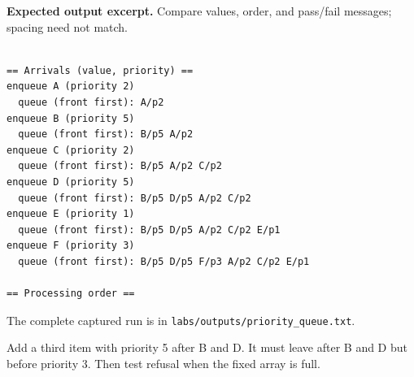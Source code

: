 \textbf{Expected output excerpt.} Compare values, order, and pass/fail messages; spacing need not match.

\begin{lstlisting}[style=utpterminal,language={}]

== Arrivals (value, priority) ==
enqueue A (priority 2)
  queue (front first): A/p2 
enqueue B (priority 5)
  queue (front first): B/p5 A/p2 
enqueue C (priority 2)
  queue (front first): B/p5 A/p2 C/p2 
enqueue D (priority 5)
  queue (front first): B/p5 D/p5 A/p2 C/p2 
enqueue E (priority 1)
  queue (front first): B/p5 D/p5 A/p2 C/p2 E/p1 
enqueue F (priority 3)
  queue (front first): B/p5 D/p5 F/p3 A/p2 C/p2 E/p1 

== Processing order ==

\end{lstlisting}

The complete captured run is in \texttt{labs/outputs/priority\_queue.txt}.

\begin{tryit}

Add a third item with priority 5 after B and D. It must leave after B and D but before priority 3. Then test refusal when the fixed array is full.

\end{tryit}
